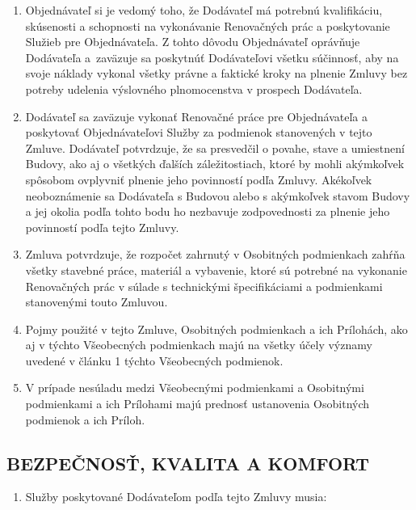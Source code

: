 \begin{multicols}{2}
\begin{enumerate}
\def\labelenumi{\arabic{enumi}.}
\item
  Objednávateľ si je vedomý toho, že Dodávateľ má potrebnú kvalifikáciu,
  skúsenosti a schopnosti na vykonávanie Renovačných prác a poskytovanie
  Služieb pre Objednávateľa. Z tohto dôvodu Objednávateľ oprávňuje
  Dodávateľa a~zaväzuje sa poskytnúť Dodávateľovi všetku súčinnosť, aby
  na svoje náklady vykonal všetky právne a faktické kroky na plnenie
  Zmluvy bez potreby udelenia výslovného plnomocenstva v prospech
  Dodávateľa.
\item
  Dodávateľ sa zaväzuje vykonať Renovačné práce pre Objednávateľa a
  poskytovať Objednávateľovi Služby za podmienok stanovených v tejto
  Zmluve. Dodávateľ potvrdzuje, že sa presvedčil o povahe, stave a
  umiestnení Budovy, ako aj o všetkých ďalších záležitostiach, ktoré by
  mohli akýmkoľvek spôsobom ovplyvniť plnenie jeho povinností podľa
  Zmluvy. Akékoľvek neoboznámenie sa Dodávateľa s Budovou alebo s
  akýmkoľvek stavom Budovy a jej okolia podľa tohto bodu ho nezbavuje
  zodpovednosti za plnenie jeho povinností podľa tejto Zmluvy.
\item
  Zmluva potvrdzuje, že rozpočet zahrnutý v Osobitných podmienkach
  zahŕňa všetky stavebné práce, materiál a vybavenie, ktoré sú potrebné
  na vykonanie Renovačných prác v súlade s technickými špecifikáciami a
  podmienkami stanovenými touto Zmluvou.
\item
  Pojmy použité v tejto Zmluve, Osobitných podmienkach a ich Prílohách,
  ako aj v týchto Všeobecných podmienkach majú na všetky účely významy
  uvedené v článku 1 týchto Všeobecných podmienok.
\item
  V prípade nesúladu medzi Všeobecnými podmienkami a Osobitnými
  podmienkami a ich Prílohami majú prednosť ustanovenia Osobitných
  podmienok a ich Príloh.
\end{enumerate}

\subsection{BEZPEČNOSŤ, KVALITA A KOMFORT}

\begin{enumerate}
\def\labelenumi{\arabic{enumi}.}
\item
  Služby poskytované Dodávateľom podľa tejto Zmluvy musia:


\end{enumerate}
\end{multicols}
